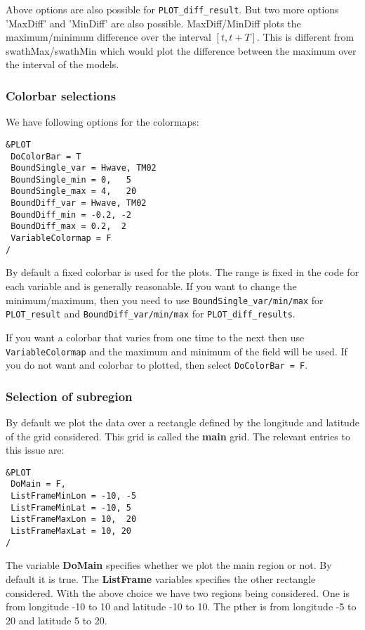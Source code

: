\documentclass[12pt]{amsart}
\begin{document}
Above options are also possible for {\tt PLOT\_diff\_result}. But two more options 'MaxDiff' and 'MinDiff' are also possible. MaxDiff/MinDiff plots the maximum/minimum difference over the interval $[t, t+T]$. This is different from swathMax/swathMin which would plot the difference between the maximum over the interval of the models.

\subsubsection{Colorbar selections}
We have following options for the colormaps:
\begin{verbatim}
&PLOT
 DoColorBar = T
 BoundSingle_var = Hwave, TM02
 BoundSingle_min = 0,   5
 BoundSingle_max = 4,   20
 BoundDiff_var = Hwave, TM02
 BoundDiff_min = -0.2, -2
 BoundDiff_max = 0.2,  2
 VariableColormap = F
/
\end{verbatim}
By default a fixed colorbar is used for the plots. The range is fixed in the code for each variable and is generally reasonable. If you want to change the minimum/maximum, then you need to use {\tt BoundSingle\_var/min/max} for {\tt PLOT\_result} and {\tt BoundDiff\_var/min/max} for {\tt PLOT\_diff\_results}.

If you want a colorbar that varies from one time to the next then use {\tt VariableColormap} and the maximum and minimum of the field will be used. If you do not want and colorbar to plotted, then select {\tt DoColorBar = F}.


\subsubsection{Selection of subregion}
By default we plot the data over a rectangle defined by the longitude and latitude of the grid considered. This grid is called the {\bf main} grid.
The relevant entries to this issue are:
\begin{verbatim}
&PLOT
 DoMain = F,
 ListFrameMinLon = -10, -5
 ListFrameMinLat = -10, 5
 ListFrameMaxLon = 10,  20
 ListFrameMaxLat = 10, 20
/
\end{verbatim}
The variable {\bf DoMain} specifies whether we plot the main region or not. By default it is true.
The {\bf ListFrame} variables specifies the other rectangle considered. With the above choice we have two regions being considered. One is from longitude -10 to 10 and latitude -10 to 10. The pther is from longitude -5 to 20 and latitude 5 to 20.
\end{document}
